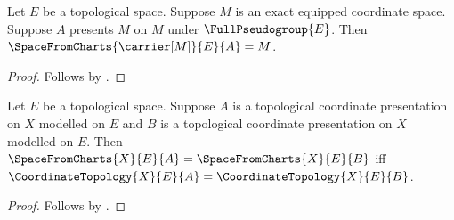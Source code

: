 \begin{theorem}\label{raw_space_recovery_consumer}
    Let $E$ be a topological space.
    Suppose $M$ is an exact equipped coordinate space.
    Suppose $A$ presents $M$ on $M$ under $\FullPseudogroup{E}$.
    Then $\SpaceFromCharts{\carrier[M]}{E}{A}=M$.
\end{theorem}
\begin{proof}
    Follows by .
\end{proof}

\begin{theorem}\label{raw_space_equality_consumer}
    Let $E$ be a topological space.
    Suppose $A$ is a topological coordinate presentation on $X$ modelled on $E$ and
        $B$ is a topological coordinate presentation on $X$ modelled on $E$.
    Then $\SpaceFromCharts{X}{E}{A}=\SpaceFromCharts{X}{E}{B}$ iff
        $\CoordinateTopology{X}{E}{A}=\CoordinateTopology{X}{E}{B}$.
\end{theorem}
\begin{proof}
    Follows by .
\end{proof}
